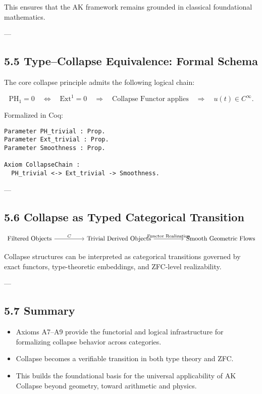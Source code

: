 \documentclass[11pt]{article}
\begin{document}
This ensures that the AK framework remains grounded in classical foundational mathematics.

---

\subsection*{5.5 Type–Collapse Equivalence: Formal Schema}

The core collapse principle admits the following logical chain:

\[
\mathrm{PH}_1 = 0 \quad \Longleftrightarrow \quad 
\mathrm{Ext}^1 = 0 \quad \Longrightarrow \quad 
\text{Collapse Functor applies} \quad \Rightarrow \quad 
u(t) \in C^\infty.
\]

Formalized in Coq:

\begin{lstlisting}[language=Coq, caption=Collapse Typing Schema in Coq]
Parameter PH_trivial : Prop.
Parameter Ext_trivial : Prop.
Parameter Smoothness : Prop.

Axiom CollapseChain :
  PH_trivial <-> Ext_trivial -> Smoothness.
\end{lstlisting}

---

\subsection*{5.6 Collapse as Typed Categorical Transition}

\[
\begin{tikzcd}[column sep=huge, row sep=large]
\text{Filtered Objects} \arrow[r, "C"]
& \text{Trivial Derived Objects} \arrow[r, "\text{Functor Realization}"]
& \text{Smooth Geometric Flows}
\end{tikzcd}
\]

Collapse structures can be interpreted as categorical transitions governed by exact functors,  
type-theoretic embeddings, and ZFC-level realizability.

---

\subsection*{5.7 Summary}

\begin{itemize}
  \item Axioms A7–A9 provide the functorial and logical infrastructure  
  for formalizing collapse behavior across categories.
  \item Collapse becomes a verifiable transition in both type theory and ZFC.
  \item This builds the foundational basis for the universal applicability  
  of AK Collapse beyond geometry, toward arithmetic and physics.
\end{itemize}
\end{document}
